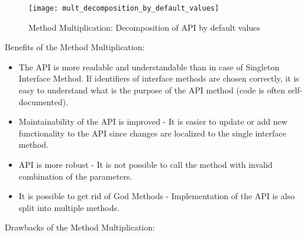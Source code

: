 \begin{figure}[!htb]
    \centering
    \texttt{[image: mult\_decomposition\_by\_default\_values]}
    \caption{Method Multiplication: Decomposition of API by default values}
    \label{fig:mult_decomposition_by_default_values}
\end{figure}

Benefits of the Method Multiplication:

\begin{itemize}
    \item The API is more readable and understandable than in case of Singleton Interface Method.
    If identifiers of interface methods are chosen correctly, it is easy to understand what is the purpose of the
    API method (code is often self-documented).
    \item Maintainability of the API is improved - It is easier to update or add new functionality to the API\@
    since changes are localized to the single interface method.
    \item API is more robust - It is not possible to call the method with invalid combination of the parameters.
    \item It is possible to get rid of God Methods - Implementation of the API is also split into multiple methods.
\end{itemize}

Drawbacks of the Method Multiplication:

